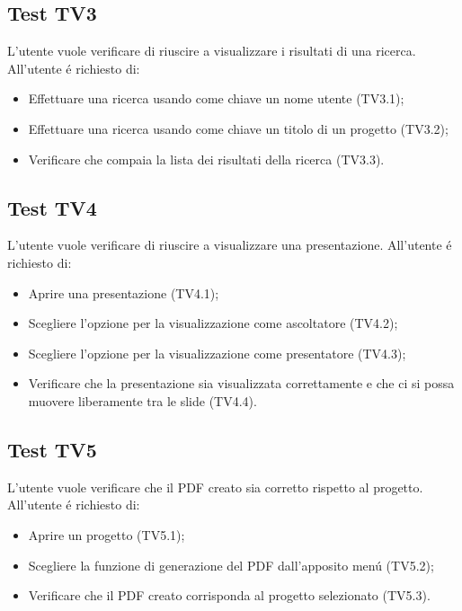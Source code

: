 \subsection{Test TV3}
L'utente vuole verificare di riuscire a visualizzare i risultati di una ricerca. \newline
All'utente \'e richiesto di:
\begin{itemize}
	\item Effettuare una ricerca usando come chiave un nome utente (TV3.1);
	\item Effettuare una ricerca usando come chiave un titolo di un progetto (TV3.2);
	\item Verificare che compaia la lista dei risultati della ricerca (TV3.3).
\end{itemize}

\subsection{Test TV4}
L'utente vuole verificare di riuscire a visualizzare una presentazione. \newline
All'utente \'e richiesto di:
\begin{itemize}
	\item Aprire una presentazione (TV4.1);
	\item Scegliere l'opzione per la visualizzazione come ascoltatore (TV4.2);
	\item Scegliere l'opzione per la visualizzazione come presentatore (TV4.3);
	\item Verificare che la presentazione sia visualizzata correttamente e che ci si possa muovere liberamente tra le \gls{slide} (TV4.4).
\end{itemize}

\subsection{Test TV5}
L'utente vuole verificare che il PDF creato sia corretto rispetto al progetto. \newline
All'utente \'e richiesto di:
\begin{itemize}
	\item Aprire un progetto (TV5.1);
	\item Scegliere la funzione di generazione del PDF dall'apposito men\'u (TV5.2);
	\item Verificare che il PDF creato corrisponda al progetto selezionato (TV5.3).
\end{itemize}

